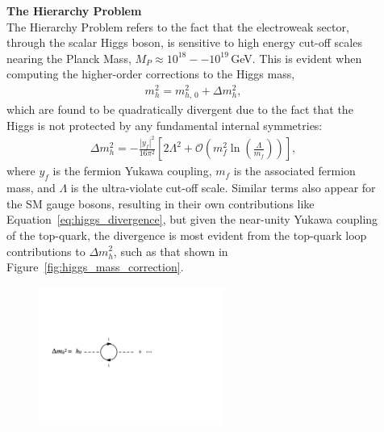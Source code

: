 \begin{description}
    \item[] \textbf{The Hierarchy Problem} \\
        The Hierarchy Problem refers to the fact that the electroweak sector, through the scalar Higgs boson,
        is sensitive to high energy cut-off scales nearing the Planck Mass, $M_{P} \approx 10^{18}--10^{19}$\,GeV.
        This is evident when computing the higher-order corrections to the Higgs mass,
        \begin{align*}
            m_h^2 = m_{h,\,0}^2 + \Delta m_h^2,
        \end{align*}
        which are found to be quadratically divergent due to the fact that the Higgs is not protected by any fundamental
        internal symmetries:
        \begin{align}
            \Delta m_h^2 = -\frac{ |y_f|^2 }{16 \pi^2} \left[ 2 \Lambda^2  + \mathcal{O} \left( m_f^2 \ln \left( \frac{\Lambda}{m_f} \right) \right) \right],
            \label{eq:higgs_divergence}
        \end{align}
        where $y_f$ is the fermion Yukawa coupling, $m_f$ is the associated fermion mass, and $\Lambda$ is the
        ultra-violate cut-off scale.
        Similar terms also appear for the SM gauge bosons, resulting in their own contributions like Equation~\ref{eq:higgs_divergence}, but given the near-unity Yukawa coupling of the top-quark,
        the divergence is most evident from the top-quark loop contributions to $\Delta m_h^2$, such as that shown in Figure~\ref{fig:higgs_mass_correction}.
        \begin{figure}[!htb]
        \hspace{1.8cm}
        \begin{minipage}{0.8\textwidth}
            \begin{center}
                \includegraphics[width=0.6\textwidth]{figures/higgs_corr/higgs_mass_correctionsPDF}

\end{center}
\end{minipage}
\end{figure}
\end{description}
